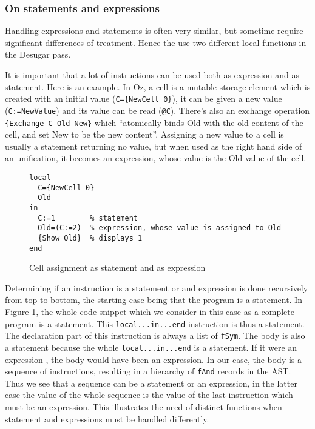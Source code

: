 \documentclass[a4paper]{memoir}
\begin{document}
\subsubsection{On statements and expressions}
Handling expressions and statements is often very similar, but sometime require significant differences of treatment. Hence the use two different local functions in the Desugar pass.

It is important that a lot of instructions can be used both as expression and as
statement. Here is an example.
In Oz, a cell is a mutable storage element which is created with an initial value (\lstinline!C={NewCell 0}!), it can be given a new value (\lstinline!C:=NewValue!) and its value can be read (\lstinline!@C!). There's also an exchange operation \lstinline!{Exchange C Old New}! which ``atomically binds Old with the old content of the cell, and set New to be the new content''.%
Assigning a new value to a cell is usually a statement returning no value, but
when used as the right hand side of an unification, it becomes an expression,
whose value is the Old value of the cell.
\begin{figure}[h]
\begin{lstlisting}
local
  C={NewCell 0}
  Old
in
  C:=1        % statement
  Old=(C:=2)  % expression, whose value is assigned to Old
  {Show Old}  % displays 1
end

\end{lstlisting}
\caption{Cell assignment as statement and as expression}
\label{fig:statement_and_expression1}
\end{figure}

Determining if an instruction is a statement or and expression is done
recursively from top to bottom, the starting case being that the program is a
statement. In Figure \ref{fig:statement_and_expression1}, the
whole code snippet which we consider in this case as a complete program is a
statement. This \lstinline!local...in...end! instruction is thus a statement.
The declaration part of this instruction is always a list of \lstinline!fSym!. The body is
also a statement because the whole \lstinline!local...in...end! is a statement. If it were
an expression , the body
would have been an expression. In our case, the body is a sequence of
instructions, resulting in a hierarchy of \lstinline!fAnd! records in the AST. Thus we see that a sequence
can be a statement or an expression, in the latter case the value
of the whole sequence is the value of the last instruction which must be an expression. This illustrates the
need of distinct functions when statement and expressions must be handled
differently. 
\end{document}
